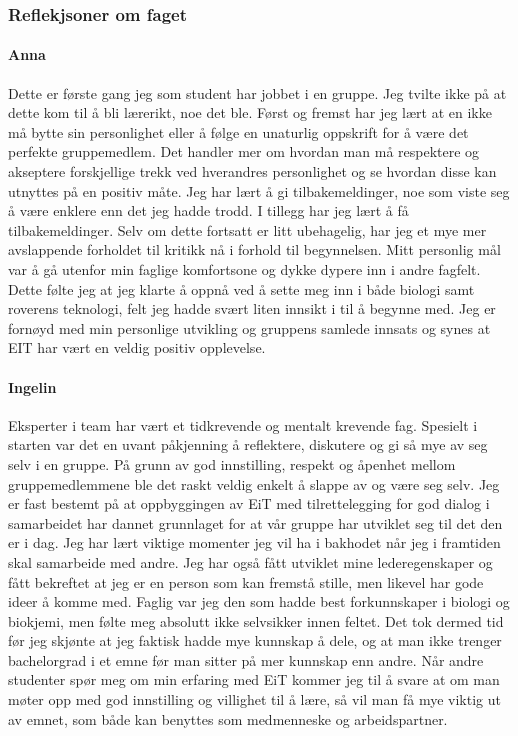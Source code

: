 \subsubsection{Reflekjsoner om faget}

\paragraph{Anna}
Dette er første gang jeg som student har jobbet i en gruppe.
Jeg tvilte ikke på at dette kom til å bli lærerikt, noe det ble.
Først og fremst har jeg lært at en ikke må bytte sin personlighet eller å følge en unaturlig oppskrift for å være det perfekte gruppemedlem. 
Det handler mer om hvordan man må respektere og akseptere forskjellige trekk ved hverandres personlighet og se hvordan disse kan utnyttes på en positiv måte. 
Jeg har lært å gi tilbakemeldinger, noe som viste seg å være enklere enn det jeg hadde trodd.
I tillegg har jeg lært å få tilbakemeldinger. 
Selv om dette fortsatt er litt ubehagelig, har jeg et mye mer avslappende forholdet til kritikk nå i forhold til begynnelsen. 
Mitt personlig mål var å gå utenfor min faglige komfortsone og dykke dypere inn i andre fagfelt. 
Dette følte jeg at jeg klarte å oppnå ved å sette meg inn i både biologi samt roverens teknologi, felt jeg hadde svært liten innsikt i til å begynne med.
Jeg er fornøyd med min personlige utvikling og gruppens samlede innsats og synes at EIT har vært en veldig positiv opplevelse. 

\paragraph{Ingelin}
Eksperter i team har vært et tidkrevende og mentalt krevende fag. 
Spesielt i starten var det en uvant påkjenning å reflektere, diskutere og gi så mye av seg selv i en gruppe. 
På grunn av god innstilling, respekt og åpenhet mellom gruppemedlemmene ble det raskt veldig enkelt å slappe av og være seg selv.
Jeg er fast bestemt på at oppbyggingen av EiT med tilrettelegging for god dialog i samarbeidet har dannet grunnlaget for at vår gruppe har utviklet seg til det den er i dag.
Jeg har lært viktige momenter jeg vil ha i bakhodet når jeg i framtiden skal samarbeide med andre.
Jeg har også fått utviklet mine lederegenskaper og fått bekreftet at jeg er en person som kan fremstå stille, men likevel har gode ideer å komme med.
Faglig var jeg den som hadde best forkunnskaper i biologi og biokjemi, men følte meg absolutt ikke selvsikker innen feltet.
Det tok dermed tid før jeg skjønte at jeg faktisk hadde mye kunnskap å dele, og at man ikke trenger bachelorgrad i et emne før man sitter på mer kunnskap enn andre.
Når andre studenter spør meg om min erfaring med EiT kommer jeg til å svare at om man møter opp med god innstilling og villighet til å lære, så vil man få mye viktig ut av emnet, som både kan benyttes som medmenneske og arbeidspartner.

